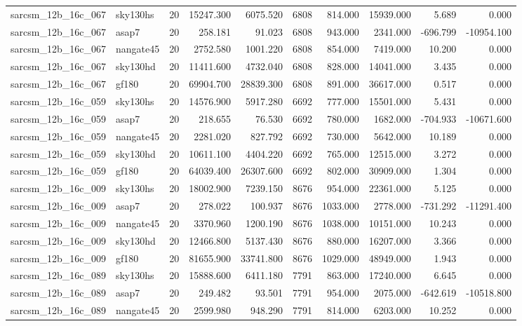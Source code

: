 \begin{tabular}{llrrrrrrrr}
sarcsm\_12b\_16c\_067 & sky130hs & 20 & 15247.300 & 6075.520 & 6808 & 814.000 & 15939.000 & 5.689 & 0.000 \\
sarcsm\_12b\_16c\_067 & asap7 & 20 & 258.181 & 91.023 & 6808 & 943.000 & 2341.000 & -696.799 & -10954.100 \\
sarcsm\_12b\_16c\_067 & nangate45 & 20 & 2752.580 & 1001.220 & 6808 & 854.000 & 7419.000 & 10.200 & 0.000 \\
sarcsm\_12b\_16c\_067 & sky130hd & 20 & 11411.600 & 4732.040 & 6808 & 828.000 & 14041.000 & 3.435 & 0.000 \\
sarcsm\_12b\_16c\_067 & gf180 & 20 & 69904.700 & 28839.300 & 6808 & 891.000 & 36617.000 & 0.517 & 0.000 \\
sarcsm\_12b\_16c\_059 & sky130hs & 20 & 14576.900 & 5917.280 & 6692 & 777.000 & 15501.000 & 5.431 & 0.000 \\
sarcsm\_12b\_16c\_059 & asap7 & 20 & 218.655 & 76.530 & 6692 & 780.000 & 1682.000 & -704.933 & -10671.600 \\
sarcsm\_12b\_16c\_059 & nangate45 & 20 & 2281.020 & 827.792 & 6692 & 730.000 & 5642.000 & 10.189 & 0.000 \\
sarcsm\_12b\_16c\_059 & sky130hd & 20 & 10611.100 & 4404.220 & 6692 & 765.000 & 12515.000 & 3.272 & 0.000 \\
sarcsm\_12b\_16c\_059 & gf180 & 20 & 64039.400 & 26307.600 & 6692 & 802.000 & 30909.000 & 1.304 & 0.000 \\
sarcsm\_12b\_16c\_009 & sky130hs & 20 & 18002.900 & 7239.150 & 8676 & 954.000 & 22361.000 & 5.125 & 0.000 \\
sarcsm\_12b\_16c\_009 & asap7 & 20 & 278.022 & 100.937 & 8676 & 1033.000 & 2778.000 & -731.292 & -11291.400 \\
sarcsm\_12b\_16c\_009 & nangate45 & 20 & 3370.960 & 1200.190 & 8676 & 1038.000 & 10151.000 & 10.243 & 0.000 \\
sarcsm\_12b\_16c\_009 & sky130hd & 20 & 12466.800 & 5137.430 & 8676 & 880.000 & 16207.000 & 3.366 & 0.000 \\
sarcsm\_12b\_16c\_009 & gf180 & 20 & 81655.900 & 33741.800 & 8676 & 1029.000 & 48949.000 & 1.943 & 0.000 \\
sarcsm\_12b\_16c\_089 & sky130hs & 20 & 15888.600 & 6411.180 & 7791 & 863.000 & 17240.000 & 6.645 & 0.000 \\
sarcsm\_12b\_16c\_089 & asap7 & 20 & 249.482 & 93.501 & 7791 & 954.000 & 2075.000 & -642.619 & -10518.800 \\
sarcsm\_12b\_16c\_089 & nangate45 & 20 & 2599.980 & 948.290 & 7791 & 814.000 & 6203.000 & 10.252 & 0.000 \\

\end{tabular}
